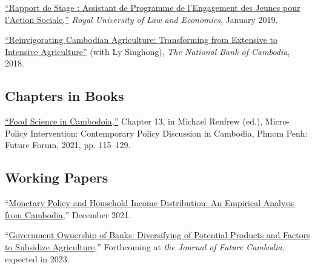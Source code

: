 \documentclass[10pt,a4paper]{article}
\begin{document}
	\href{https://www.researchgate.net/publication/330936932_Rapport_du_Stage_Assistant_de_Programme_a_l%27YRDP}{``Rapport de Stage : Assistant de Programme de l'Engagement des Jeunes pour l'Action Sociale,”} \textit{Royal University of Law and Economics}, January 2019. \\ \vspace{-.5em}
			
	\href{https://ideas.repec.org/p/pra/mprapa/93086.html}{``Reinvigorating Cambodian Agriculture: Transforming from Extensive to Intensive Agriculture”} (with Ly Singhong), \textit{The National Bank of Cambodia}, 2018. \\ \vspace{-.5em}
			
\subsection*{Chapters in Books}

\href{https://kosalnith.github.io/research/policies/PolicyBrief-FST.pdf}{``Food Science in Cambodoia,''} Chapter 13, in Michael Renfrew (ed.), Micro-Policy Intervention: Contemporary Policy Discussion in Cambodia, Phnom Penh: Future Forum, 2021, pp. 115–129. 

\subsection*{Working Papers}

	“\href{https://kosalnith.github.io/research/papers/MPHI.pdf}{Monetary Policy and Household Income Distribution: An Empirical Analysis from Cambodia},” December 2021.\\ \vspace{-.5em}
	
	“\href{https://kosalnith.github.io/research/papers/GOB.pdf}{Government Ownership of Banks: Diversifying of Potential Products and Factors to Subsidize Agriculture},” Forthcoming at \textit{the Journal of Future Cambodia}, expected in 2023.

\end{document}
